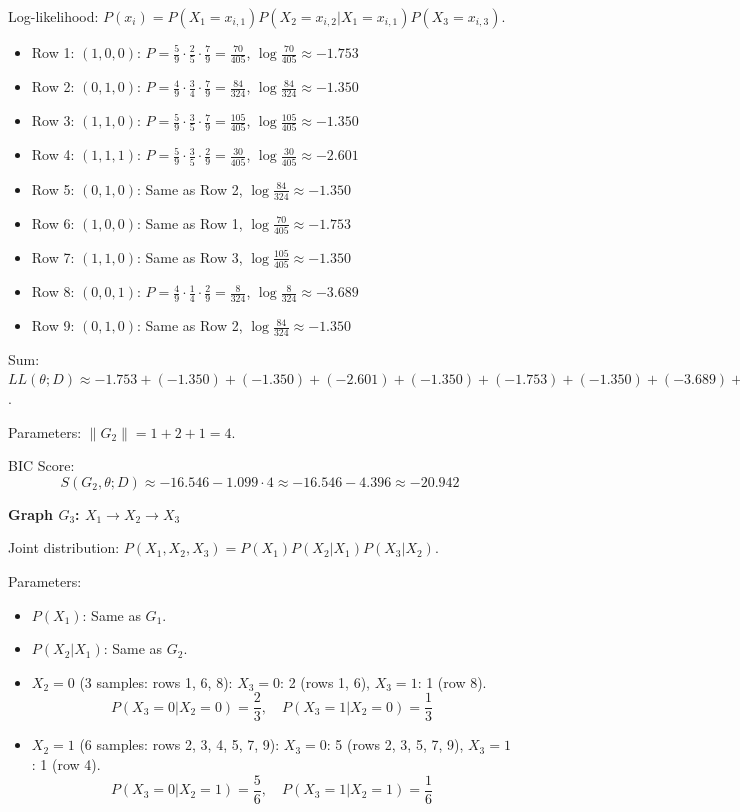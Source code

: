 \documentclass[a3paper,12pt]{extarticle} %
\begin{document}
Log-likelihood: \(P(x_i) = P(X_1 = x_{i,1}) P(X_2 = x_{i,2} | X_1 = x_{i,1}) P(X_3 = x_{i,3})\).
\begin{itemize}
    \item Row 1: \((1,0,0)\): \(P = \frac{5}{9} \cdot \frac{2}{5} \cdot \frac{7}{9} = \frac{70}{405}\), \(\log \frac{70}{405} \approx -1.753\)
    \item Row 2: \((0,1,0)\): \(P = \frac{4}{9} \cdot \frac{3}{4} \cdot \frac{7}{9} = \frac{84}{324}\), \(\log \frac{84}{324} \approx -1.350\)
    \item Row 3: \((1,1,0)\): \(P = \frac{5}{9} \cdot \frac{3}{5} \cdot \frac{7}{9} = \frac{105}{405}\), \(\log \frac{105}{405} \approx -1.350\)
    \item Row 4: \((1,1,1)\): \(P = \frac{5}{9} \cdot \frac{3}{5} \cdot \frac{2}{9} = \frac{30}{405}\), \(\log \frac{30}{405} \approx -2.601\)
    \item Row 5: \((0,1,0)\): Same as Row 2, \(\log \frac{84}{324} \approx -1.350\)
    \item Row 6: \((1,0,0)\): Same as Row 1, \(\log \frac{70}{405} \approx -1.753\)
    \item Row 7: \((1,1,0)\): Same as Row 3, \(\log \frac{105}{405} \approx -1.350\)
    \item Row 8: \((0,0,1)\): \(P = \frac{4}{9} \cdot \frac{1}{4} \cdot \frac{2}{9} = \frac{8}{324}\), \(\log \frac{8}{324} \approx -3.689\)
    \item Row 9: \((0,1,0)\): Same as Row 2, \(\log \frac{84}{324} \approx -1.350\)
\end{itemize}
Sum: \(LL(\theta; D) \approx -1.753 + (-1.350) + (-1.350) + (-2.601) + (-1.350) + (-1.753) + (-1.350) + (-3.689) + (-1.350) \approx -16.546\).

Parameters: \(\|G_2\| = 1 + 2 + 1 = 4\).

BIC Score:
\[
S(G_2, \theta; D) \approx -16.546 - 1.099 \cdot 4 \approx -16.546 - 4.396 \approx -20.942
\]

\textbf{Graph \(G_3\): \(X_1 \to X_2 \to X_3\)}

Joint distribution: \(P(X_1, X_2, X_3) = P(X_1)P(X_2 | X_1)P(X_3 | X_2)\).

Parameters:
\begin{itemize}
    \item \(P(X_1)\): Same as \(G_1\).
    \item \(P(X_2 | X_1)\): Same as \(G_2\).
    \item \(X_2 = 0\) (3 samples: rows 1, 6, 8): \(X_3 = 0\): 2 (rows 1, 6), \(X_3 = 1\): 1 (row 8).
    \[
    P(X_3 = 0 | X_2 = 0) = \frac{2}{3}, \quad P(X_3 = 1 | X_2 = 0) = \frac{1}{3}
    \]
    \item \(X_2 = 1\) (6 samples: rows 2, 3, 4, 5, 7, 9): \(X_3 = 0\): 5 (rows 2, 3, 5, 7, 9), \(X_3 = 1\): 1 (row 4).
    \[
    P(X_3 = 0 | X_2 = 1) = \frac{5}{6}, \quad P(X_3 = 1 | X_2 = 1) = \frac{1}{6}
    \]
\end{itemize}
\end{document}
